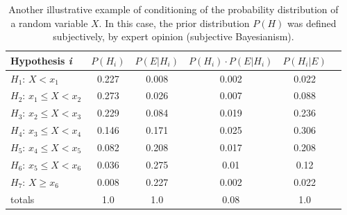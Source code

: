 \documentclass[./main_en.tex]{subfiles}
\begin{document}
\begin{table}[t]
    \centering	
    \small
    \sffamily
    \begin{tabular}{ l  c  c  c  c c} %
        \toprule
        \textbf{Hypothesis \textit{i}} & \textbf{$P(H_i)$} & \textbf{$P(E | H_i)$} & \textbf{$P(H_i) \cdot P(E | H_i)$} & \textbf{$P(H_i | E)$}\\ 
        \midrule
        $H_1$: $X < x_1$ & 0.227 & 0.008 & 0.002 & 0.022\\ 
        $H_2$: $x_1 \leq X < x_2$ & 0.273 & 0.026 & 0.007 & 0.088\\ 
        $H_3$: $x_2 \leq X < x_3$ & 0.229 & 0.084 & 0.019 & 0.236\\ 
        $H_4$: $x_3 \leq X < x_4$ & 0.146 & 0.171 & 0.025 & 0.306\\ 
        $H_5$: $x_4 \leq X < x_5$ & 0.082 & 0.208 & 0.017 & 0.208\\ 
        $H_6$: $x_5 \leq X < x_6$ & 0.036 & 0.275 & 0.01 & 0.12\\ 
        $H_7$: $X \geq x_6$ & 0.008 & 0.227 & 0.002 & 0.022\\ 
        \midrule
        totals & 1.0 & 1.0 & 0.08 & 1.0\\
        \bottomrule
    \end{tabular}
    \caption[Subjective \gls{conditioning} example]{
    Another illustrative example of \gls{conditioning} of the probability distribution of a random variable $X$. In this case, the prior distribution $P(H)$ was defined subjectively, by expert opinion (subjective Bayesianism).
    }
    \label{tbl:subjective}
\end{table}
\end{document}
